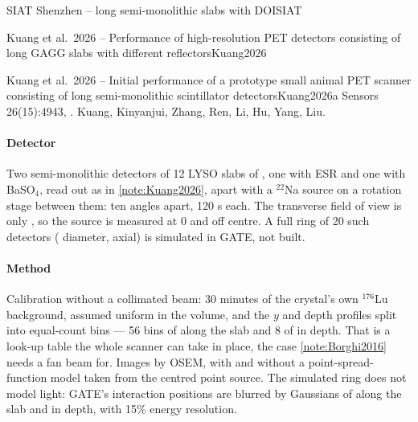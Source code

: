 \begin{programnote}{SIAT Shenzhen -- long semi-monolithic slabs with DOI}{SIAT}
\begin{papernote}{Kuang et al.\ 2026 -- Performance of high-resolution PET detectors consisting of long GAGG slabs with different reflectors}{Kuang2026}
\end{papernote}

\begin{papernote}{Kuang et al.\ 2026 -- Initial performance of a prototype small animal PET scanner consisting of long semi-monolithic scintillator detectors}{Kuang2026a}
Sensors 26(15):4943, . Kuang, Kinyanjui, Zhang, Ren, Li,
Hu, Yang, Liu.

\paragraph{Detector}
Two semi-monolithic detectors of 12 LYSO slabs of
, one with ESR and one with BaSO$_4$, read out
as in \ref{note:Kuang2026},  apart with a  $^{22}$Na source on a
rotation stage between them: ten angles  apart, 120 s each. The
transverse field of view is only , so the source is measured at 0 and
 off centre. A full ring of 20 such detectors ( diameter, 
axial) is simulated in GATE, not built.

\paragraph{Method}
Calibration without a collimated beam: 30 minutes of the crystal's own
$^{176}$Lu background, assumed uniform in the volume, and the $y$ and depth
profiles split into equal-count bins --- 56 bins of  along the slab and 8
of  in depth. That is a look-up table the whole scanner can take in
place, the case \ref{note:Borghi2016} needs a fan beam for. Images by OSEM, with
and without a point-spread-function model taken from the centred point source.
The simulated ring does not model light: GATE's interaction positions are
blurred by Gaussians of  along the slab and  in depth, with
15\% energy resolution.


\end{papernote}
\end{programnote}
